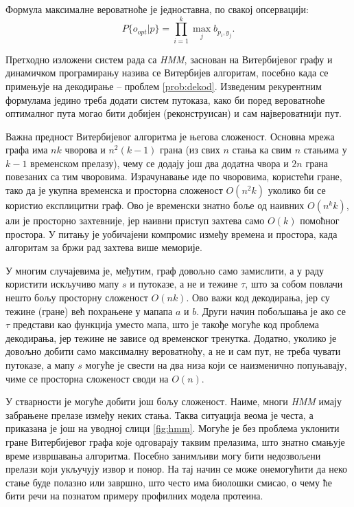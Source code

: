 \documentclass[12pt,oneside]{memoir}
\begin{document}
\begin{CJK}{UTF8}{ipxm}
Формула максималне вероватноће је једноставна, по свакој опсервацији: $$P\{o_{opt} | p\} = \prod_{i=1}^k \max_j b_{p_i, y_j}.$$

Претходно изложени систем рада са \textit{HMM}, заснован на Витербијевог графу и динамичком програмирању назива се Витербијев алгоритам\cite{ba10c}, посебно када се примењује на декодирање -- проблем \ref{prob:dekod}. Изведеним рекурентним формулама једино треба додати систем путоказа, како би поред вероватноће оптималног пута могао бити добијен (реконструисан) и сам највероватнији пут.

Важна предност Витербијевог алгоритма је његова сложеност. Основна мрежа графа има $nk$ чворова и $n^2 (k-1)$ грана (из свих $n$ стања ка свим $n$ стањима у $k-1$ временском прелазу), чему се додају још два додатна чвора и $2n$ грана повезаних са тим чворовима. Израчунавање иде по чворовима, користећи гране, тако да је укупна временска и просторна сложеност $O(n^2 k)$ уколико би се користио експлицитни граф. Ово је временски знатно боље од наивних $O(n^k k)$, али је просторно захтевније, јер наивни приступ захтева само $O(k)$ помоћног простора. У питању је уобичајени компромис између времена и простора, када алгоритам за бржи рад захтева више меморије.

У многим случајевима је, међутим, граф довољно само замислити, а у раду користити искључиво мапу $s$ и путоказе, а не и тежине $\tau$, што за собом повлачи нешто бољу просторну сложеност $O(nk)$. Ово важи код декодирања, јер су тежине (гране) већ похрањене у мапапа $a$ и $b$. Други начин побољшања је ако се $\tau$ представи као функција уместо мапа, што је такође могуће код проблема декодирања, јер тежине не зависе од временског тренутка. Додатно, уколико је довољно добити само максималну вероватноћу, а не и сам пут, не треба чувати путоказе, а мапу $s$ могуће је свести на два низа који се наизменично попуњавају, чиме се просторна сложеност своди на $O(n)$.

У стварности је могуће добити још бољу сложеност. Наиме, многи \textit{HMM} имају забрањене прелазе између неких стања. Таква ситуација веома је честа, а приказана је још на уводној слици \ref{fig:hmm}. Могуће је без проблема уклонити гране Витербијевог графа које одговарају таквим прелазима, што знатно смањује време извршавања алгоритма. Посебно занимљиви могу бити недозвољени прелази који укључују извор и понор. На тај начин се може онемогућити да неко стање буде полазно или завршно, што често има биолошки смисао, о чему ће бити речи на познатом примеру профилних модела протеина.


\end{CJK}
\end{document}
